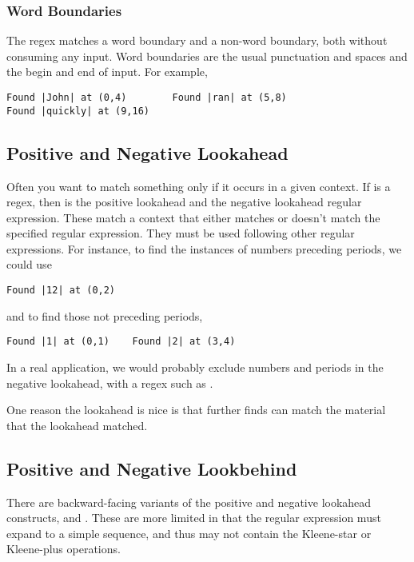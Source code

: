 \subsubsection{Word Boundaries}

The regex  matches a word boundary and  a
non-word boundary, both without consuming any input.  Word boundaries
are the usual punctuation and spaces and the begin and end of input.
For example,
%
\begin{verbatim}
Found |John| at (0,4)        Found |ran| at (5,8)    
Found |quickly| at (9,16)
\end{verbatim}


\subsection{Positive and Negative Lookahead}

Often you want to match something only if it occurs in a given
context.  If  is a regex, then  is
the positive lookahead and  the negative
lookahead regular expression.  These match a context that either
matches or doesn't match the specified regular expression.  They
must be used following other regular expressions.  For instance,
to find the instances of numbers preceding periods, we could
use 
%
\begin{verbatim}
Found |12| at (0,2)
\end{verbatim}
%
and to find those not preceding periods, 
%
\begin{verbatim}
Found |1| at (0,1)    Found |2| at (3,4)
\end{verbatim}
%
In a real application, we would probably exclude numbers and periods
in the negative lookahead, with a regex such as
.

One reason the lookahead is nice is that further finds can match
the material that the lookahead matched.

\subsection{Positive and Negative Lookbehind}\label{section:regex-lookbehind}

There are backward-facing variants of the positive and negative
lookahead constructs,  and 
.  These are more limited in that the
regular expression  must expand to a simple sequence, and
thus may not contain the Kleene-star or Kleene-plus operations.

